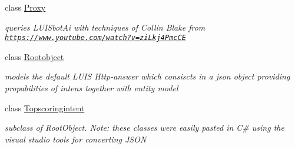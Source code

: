 \begin{DoxyCompactItemize}
class \hyperlink{class_listen_to_me_1_1_model_1_1_proxy}{Proxy}
\begin{DoxyCompactList}\small\item\em queries L\+U\+I\+Sbot\+Ai with techniques of Collin Blake from \href{https://www.youtube.com/watch?v=ziLkj4PmcCE}{\tt https\+://www.\+youtube.\+com/watch?v=zi\+Lkj4\+Pmc\+CE} \end{DoxyCompactList}\item 
class \hyperlink{class_listen_to_me_1_1_model_1_1_rootobject}{Rootobject}
\begin{DoxyCompactList}\small\item\em models the default L\+U\+IS Http-\/answer which consiscts in a json object providing propabilities of intens together with entity model \end{DoxyCompactList}\item 
class \hyperlink{class_listen_to_me_1_1_model_1_1_topscoringintent}{Topscoringintent}
\begin{DoxyCompactList}\small\item\em subclass of Root\+Object. Note\+: these classes were easily pasted in C\# using the visual studio tools for converting J\+S\+ON \end{DoxyCompactList}\end{DoxyCompactItemize}
